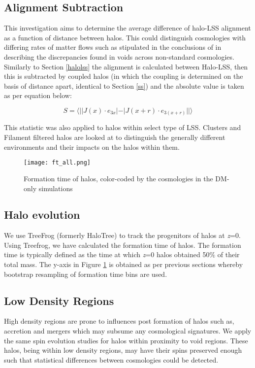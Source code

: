 \documentclass[a4paper,fleqn,usenatbib]{mnras}
\begin{document}
\subsection{Alignment Subtraction}
This investigation aims to determine the average difference of  halo-LSS alignment as a function of distance between halos. This could distinguish cosmologies with differing rates of matter flows such as stipulated in the conclusions of \citet{Adermann_18} in describing the discrepancies found in voids across non-standard cosmologies. Similarly to Section \ref{halolss} the alignment is calculated between Halo-LSS, then this is subtracted by coupled halos (in which the coupling is determined on the basis of distance apart, identical to Section \ref{ss}) and the absolute value is taken as per equation below:
\begin{ceqn}
\begin{equation}
S=\langle||J(x)\cdot e_{3x}|-|J(x+r)\cdot e_{3(x+r)}||\rangle
\label{hhsubeq}
\end{equation}
\end{ceqn}
This statistic was also applied to halos within select type of LSS. Clusters and Filament filtered halos are looked at to distinguish the generally different environments and their impacts on the halos within them. 
\begin{figure}
\centering
\texttt{[image: ft\_all.png]} 
\caption{Formation time of halos, color-coded by the cosmologies in the DM-only simulations }\label{ft}
\end{figure}
\subsection{Halo evolution}
We use TreeFrog (formerly HaloTree) to track the progenitors of halos at \textit{z}=0. Using Treefrog, we have calculated the formation time of halos. The formation time is typically defined as the time at which \textit{z}=0 halos obtained 50$\%$ of their total mass. The y-axis in Figure \ref{ft} is obtained as per previous sections whereby bootstrap resampling of formation time bins are used. 

\subsection{Low Density Regions}
High density regions are prone to influences post formation of halos such as, accretion and mergers which may subsume any cosmological signatures. We apply the same spin evolution studies for halos within proximity to void regions. These halos, being within low density regions, may have their spins preserved enough such that statistical differences between cosmologies could be detected.
\end{document}

